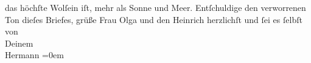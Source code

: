 \begin{ledgroupsized}[t]{13cm}
               das höchſte Wolſein iſt, mehr als Sonne und Meer.\pend
           \pstart
           Entſchuldige den verworrenen Ton dieſes Briefes, grüße Frau Olga und den Heinrich
               herzlichſt und ſei es ſelbſt von{\\[\baselineskip]}Deinem{\\[\baselineskip]}\spacefill\mbox{Hermann}\pend
           \leftskip=0em{}
         
         \endnumbering{}\end{ledgroupsized}  \newcommand{\dateiname}{L01474}\newcommand{\titel}{Hermann Bahr an Arthur Schnitzler, 4. [12.] 1904}\newcommand{\editorInnen}{ Kurt Ifkovits,  Martin Anton Müller}
      